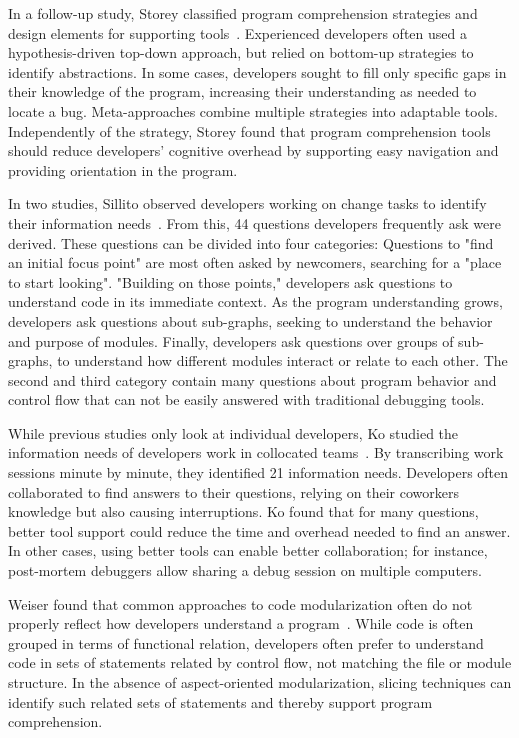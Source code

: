 In a follow-up study, Storey \etal classified program comprehension strategies and design elements for supporting tools~\cite{storey99:cognitive_design_elements}.
Experienced developers often used a hypothesis-driven top-down approach, but relied on bottom-up strategies to identify abstractions.
In some cases, developers sought to fill only specific gaps in their knowledge of the program, increasing their understanding as needed to locate a bug.
Meta-approaches combine multiple strategies into adaptable tools.
Independently of the strategy, Storey \etal found that program comprehension tools should reduce developers' cognitive overhead by supporting easy navigation and providing orientation in the program.

In two studies, Sillito \etal observed developers working on change tasks to identify their information needs~\cite{sillito06:questions_programmers_ask}.
From this, 44 questions developers frequently ask were derived.
These questions can be divided into four categories:
Questions to "find an initial focus point" are most often asked by newcomers, searching for a "place to start looking".
"Building on those points," developers ask questions to understand code in its immediate context.
As the program understanding grows, developers ask questions about sub-graphs, seeking to understand the behavior and purpose of modules.
Finally, developers ask questions over groups of sub-graphs, to understand how different modules interact or relate to each other.
The second and third category contain many questions about program behavior and control flow that can not be easily answered with traditional debugging tools.

While previous studies only look at individual developers, Ko \etal studied the information needs of developers work in collocated teams~\cite{ko07:information_needs_in_collocated}.
By transcribing work sessions minute by minute, they identified 21 information needs.
Developers often collaborated to find answers to their questions, relying on their coworkers knowledge but also causing interruptions.
Ko \etal found that for many questions, better tool support could reduce the time and overhead needed to find an answer.
In other cases, using better tools can enable better collaboration; for instance, post-mortem debuggers allow sharing a debug session on multiple computers.

Weiser found that common approaches to code modularization often do not properly reflect how developers understand a program~\cite{weiser82:programmers_use_slices_when}.
While code is often grouped in terms of functional relation, developers often prefer to understand code in sets of statements related by control flow, not matching the file or module structure.
In the absence of aspect-oriented modularization, slicing techniques can identify such related sets of statements and thereby support program comprehension.

